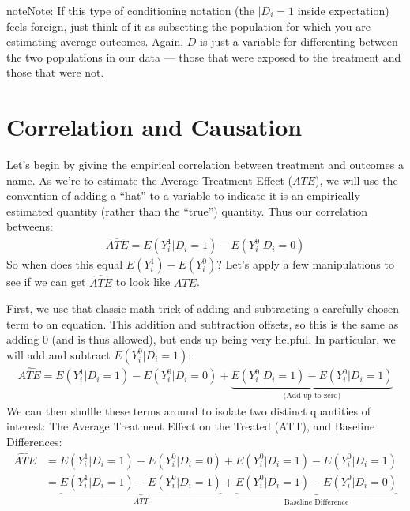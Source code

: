 \documentclass[letterpaper,10pt,english]{jupyterBook}
\begin{document}
\begin{sphinxadmonition}{note}{Note:}
\sphinxAtStartPar
If this type of conditioning notation (the \(| D_i = 1\) inside expectation) feels foreign, just think of it as subsetting the population for which you are estimating average outcomes. Again, \(D\) is just a variable for differenting between the two populations in our data — those that were exposed to the treatment and those that were not.
\end{sphinxadmonition}


\section{Correlation and Causation}
\label{\detokenize{35_causal/10_potential_outcomes:correlation-and-causation}}
\sphinxAtStartPar
Let’s begin by giving the empirical correlation between treatment and outcomes a name. As we’re  to estimate the Average Treatment Effect (\(ATE\)), we will use the convention of adding a “hat” to a variable to indicate it is an empirically estimated quantity (rather than the “true”) quantity. Thus our correlation betweens:
\begin{equation*}
\begin{split}\widehat{ATE} = E(Y^1_i | D_i = 1) - E(Y^0_i | D_i = 0)\end{split}
\end{equation*}
\sphinxAtStartPar
So when does this equal \(E(Y^1_i) - E(Y^0_i)\)? Let’s apply a few manipulations to see if we can get \(\widehat{ATE}\) to look like \(ATE\).

\sphinxAtStartPar
First,  we use that classic math trick of adding and subtracting a carefully chosen term to an equation. This addition and subtraction offsets, so this is the same as adding 0 (and is thus allowed), but ends up being very helpful. In particular, we will add and subtract \(E(Y_i^0|D_i = 1)\):
\begin{equation*}
\begin{split}
\widehat{ATE }=  E(Y_i^1|D_i = 1) - E(Y_i^0|D_i = 0) + \underbrace{E(Y_i^0|D_i = 1) - E(Y_i^0|D_i = 1)}_\text{(Add up to zero)}
\end{split}
\end{equation*}
\sphinxAtStartPar
We can then shuffle these terms around to isolate two distinct quantities of interest: The Average Treatment Effect on the Treated (ATT), and Baseline Differences:
\begin{equation*}
\begin{split}
\widehat{ATE }&=  E(Y_i^1|D_i = 1) - E(Y_i^0|D_i = 0) + E(Y_i^0|D_i = 1) - E(Y_i^0|D_i = 1) \\
&= \underbrace{E(Y^1_i|D_i = 1) - E(Y_i^0|D_i = 1)}_\text{$ATT$} + \underbrace{E(Y^0_i|D_i = 1) - E(Y_i^0|D_i = 0)}_\text{Baseline Difference}
\end{split}
\end{equation*}
\end{document}
